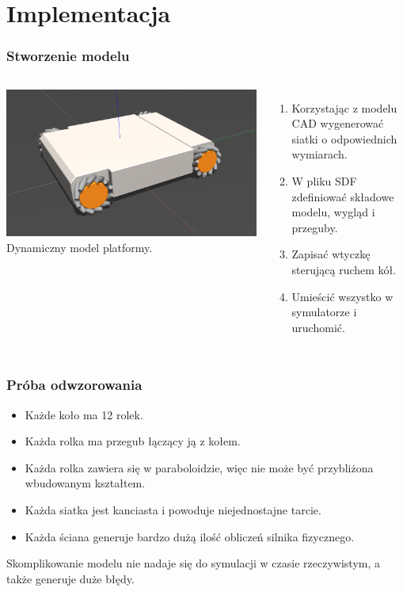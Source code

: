 \documentclass{beamer}
\begin{document}
	\section{Implementacja}
	\begin{frame}
		\frametitle{Stworzenie modelu}
		\begin{columns}[c]
			\includegraphics[width=\textwidth]{graphics/model.png} \\
			Dynamiczny model platformy.
			\begin{enumerate}
			\item Korzystając z modelu CAD wygenerować siatki o odpowiednich wymiarach.
			\item W pliku SDF zdefiniować składowe modelu, wygląd i przeguby.
			\item Zapisać wtyczkę sterującą ruchem kół.
			\item Umieścić wszystko w symulatorze i uruchomić.
		\end{enumerate}
		\end{columns}
	\end{frame}
	\begin{frame}
		\frametitle{Próba odwzorowania}
		\begin{itemize}
		\item Każde koło ma 12 rolek.
		\item Każda rolka ma przegub łączący ją z kołem.
		\item Każda rolka zawiera się w paraboloidzie, więc nie może być przybliżona wbudowanym kształtem.
		\item Każda siatka jest kanciasta i powoduje niejednostajne tarcie.
		\item Każda ściana generuje bardzo dużą ilość obliczeń silnika fizycznego.
		\end{itemize}
		Skomplikowanie modelu nie nadaje się do symulacji w czasie rzeczywistym, a także generuje duże błędy.
	\end{frame}
\end{document}
